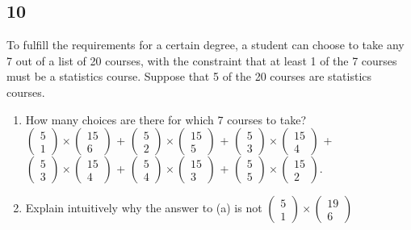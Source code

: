 \documentclass{article}
\begin{document}
\subsection{10}
To fulfill the requirements for a certain degree, a student can choose to take any 7 out of a list of 20 courses, with the constraint that at least 1 of the 7 courses must be a statistics course. Suppose that 5 of the 20 courses are statistics courses.
\begin{enumerate}
    \item How many choices are there for which 7 courses to take? $ $\\
    $\begin{pmatrix}
    5\\
    1
    \end{pmatrix} \times \begin{pmatrix}
    15\\
    6
    \end{pmatrix}$ + $\begin{pmatrix}
    5\\
    2
    \end{pmatrix} \times \begin{pmatrix}
    15\\
    5
    \end{pmatrix}$ + $\begin{pmatrix}
    5\\
    3
    \end{pmatrix} \times \begin{pmatrix}
    15\\
    4
    \end{pmatrix}$ + $\begin{pmatrix}
    5\\
    3
    \end{pmatrix} \times \begin{pmatrix}
    15\\
    4
    \end{pmatrix}$ + $\begin{pmatrix}
    5\\
    4
    \end{pmatrix} \times \begin{pmatrix}
    15\\
    3
    \end{pmatrix}$ + $\begin{pmatrix}
    5\\
    5
    \end{pmatrix} \times \begin{pmatrix}
    15\\
    2
    \end{pmatrix}$.
    \item Explain intuitively why the answer to (a) is not $\begin{pmatrix}
    5\\
    1
    \end{pmatrix} \times \begin{pmatrix}
    19\\
    6
    \end{pmatrix}$
    

\end{enumerate}
\end{document}
